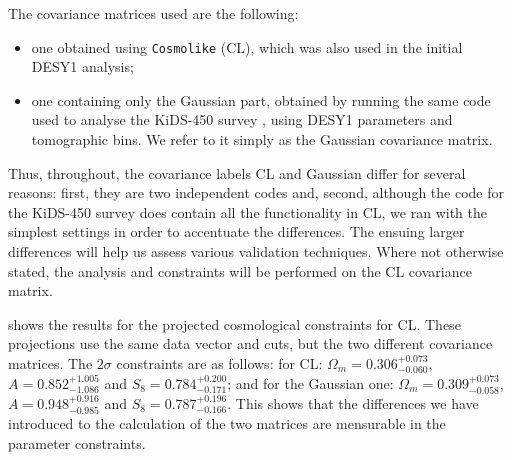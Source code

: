 \documentclass[twocolumn]{\docclass}
\newcommand\scott[1]{{\bf [Scott: #1]}}
\begin{document}
	The covariance matrices used are the following:
	\begin{itemize}
		\item one obtained using {\tt Cosmolike} \citep{Krause:2016jvl} (CL), which was also used in the initial DESY1 analysis;
		\item one containing only the Gaussian part, obtained by running the same code used to analyse the KiDS-450 survey \citep{Kohlinger:2017sxk}, using DESY1 parameters and tomographic bins. We refer to it simply as the Gaussian covariance matrix. 
	\end{itemize}
	Thus, throughout, the covariance labels CL and Gaussian differ for several reasons: first, they are two independent codes and, second, although the code for the KiDS-450 survey does contain all the functionality in CL, we ran with the simplest settings in order to accentuate the differences. The ensuing larger differences will help us assess various validation techniques. Where not otherwise stated, the analysis and constraints will be performed on the CL covariance matrix.
	
	 shows the results for the projected cosmological constraints for CL. These projections use the same data vector and cuts, but the two different covariance matrices. The $2\sigma$ constraints are as follows: for CL: $\Omega_m= 0.306^{+ 0.073}_{- 0.060}$, $A = 0.852^{+ 1.005}_{- 1.086}$ and $S_8 = 0.784^{+ 0.200}_{- 0.171}$; and for the Gaussian one: $\Omega_m = 0.309^{+ 0.073}_{- 0.058}$, 	$A = 0.948^{+ 0.916}_{- 0.985}$ and $S_8 = 0.787^{+ 0.196}_{- 0.166}$. This shows that the differences we have introduced to the calculation of the two matrices are mensurable in the parameter constraints.
	
\end{document}
